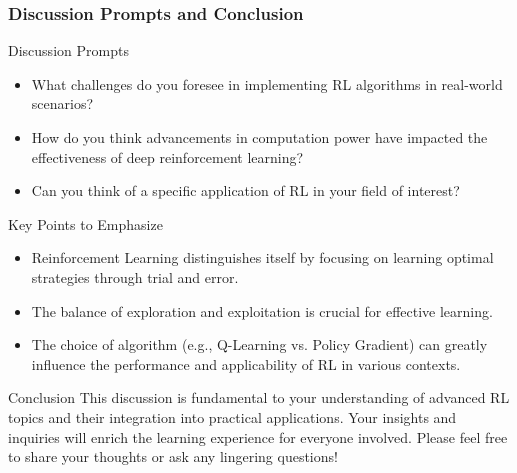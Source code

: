 \documentclass[aspectratio=169]{beamer}
\begin{document}
\begin{frame}[fragile]
    \frametitle{Discussion Prompts and Conclusion}
    \begin{block}{Discussion Prompts}
        \begin{itemize}
            \item What challenges do you foresee in implementing RL algorithms in real-world scenarios?
            \item How do you think advancements in computation power have impacted the effectiveness of deep reinforcement learning?
            \item Can you think of a specific application of RL in your field of interest?
        \end{itemize}
    \end{block}

    \begin{block}{Key Points to Emphasize}
        \begin{itemize}
            \item Reinforcement Learning distinguishes itself by focusing on learning optimal strategies through trial and error.
            \item The balance of exploration and exploitation is crucial for effective learning.
            \item The choice of algorithm (e.g., Q-Learning vs. Policy Gradient) can greatly influence the performance and applicability of RL in various contexts.
        \end{itemize}
    \end{block}

    \begin{block}{Conclusion}
        This discussion is fundamental to your understanding of advanced RL topics and their integration into practical applications. Your insights and inquiries will enrich the learning experience for everyone involved. Please feel free to share your thoughts or ask any lingering questions!
    \end{block}
\end{frame}
\end{document}
